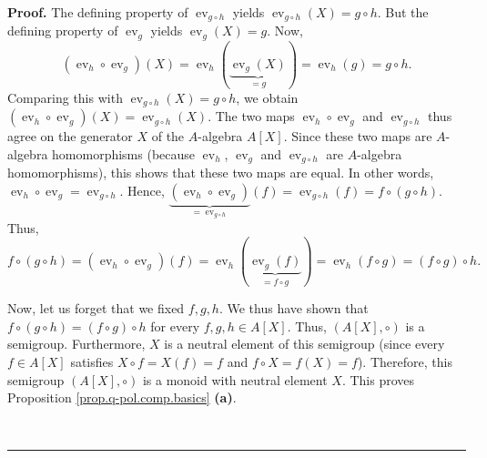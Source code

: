 \documentclass[numbers=enddot,12pt,final,onecolumn,notitlepage]{scrartcl}%
\theoremstyle{definition}
\newenvironment{proof}[1][Proof]{\noindent\textbf{#1.} }{\ \rule{0.5em}{0.5em}}
\begin{document}
\begin{proof}
The defining property of $\operatorname*{ev}\nolimits_{g\circ h}$ yields
$\operatorname*{ev}\nolimits_{g\circ h}\left(  X\right)  =g\circ h$. But the
defining property of $\operatorname*{ev}\nolimits_{g}$ yields
$\operatorname*{ev}\nolimits_{g}\left(  X\right)  =g$. Now,%
\[
\left(  \operatorname*{ev}\nolimits_{h}\circ\operatorname*{ev}\nolimits_{g}%
\right)  \left(  X\right)  =\operatorname*{ev}\nolimits_{h}\left(
\underbrace{\operatorname*{ev}\nolimits_{g}\left(  X\right)  }_{=g}\right)
=\operatorname*{ev}\nolimits_{h}\left(  g\right)  =g\circ h.
\]
Comparing this with $\operatorname*{ev}\nolimits_{g\circ h}\left(  X\right)
=g\circ h$, we obtain $\left(  \operatorname*{ev}\nolimits_{h}\circ
\operatorname*{ev}\nolimits_{g}\right)  \left(  X\right)  =\operatorname*{ev}%
\nolimits_{g\circ h}\left(  X\right)  $. The two maps $\operatorname*{ev}%
\nolimits_{h}\circ\operatorname*{ev}\nolimits_{g}$ and $\operatorname*{ev}%
\nolimits_{g\circ h}$ thus agree on the generator $X$ of the $A$-algebra
$A\left[  X\right]  $. Since these two maps are $A$-algebra homomorphisms
(because $\operatorname*{ev}\nolimits_{h}$, $\operatorname*{ev}\nolimits_{g}$
and $\operatorname*{ev}\nolimits_{g\circ h}$ are $A$-algebra homomorphisms),
this shows that these two maps are equal. In other words, $\operatorname*{ev}%
\nolimits_{h}\circ\operatorname*{ev}\nolimits_{g}=\operatorname*{ev}%
\nolimits_{g\circ h}$. Hence, $\underbrace{\left(  \operatorname*{ev}%
\nolimits_{h}\circ\operatorname*{ev}\nolimits_{g}\right)  }%
_{=\operatorname*{ev}\nolimits_{g\circ h}}\left(  f\right)
=\operatorname*{ev}\nolimits_{g\circ h}\left(  f\right)  =f\circ\left(  g\circ
h\right)  $. Thus,%
\[
f\circ\left(  g\circ h\right)  =\left(  \operatorname*{ev}\nolimits_{h}%
\circ\operatorname*{ev}\nolimits_{g}\right)  \left(  f\right)
=\operatorname*{ev}\nolimits_{h}\left(  \underbrace{\operatorname*{ev}%
\nolimits_{g}\left(  f\right)  }_{=f\circ g}\right)  =\operatorname*{ev}%
\nolimits_{h}\left(  f\circ g\right)  =\left(  f\circ g\right)  \circ h.
\]


Now, let us forget that we fixed $f,g,h$. We thus have shown that
$f\circ\left(  g\circ h\right)  =\left(  f\circ g\right)  \circ h$ for every
$f,g,h\in A\left[  X\right]  $. Thus, $\left(  A\left[  X\right]
,\circ\right)  $ is a semigroup. Furthermore, $X$ is a neutral element of this
semigroup (since every $f\in A\left[  X\right]  $ satisfies $X\circ f=X\left(
f\right)  =f$ and $f\circ X=f\left(  X\right)  =f$). Therefore, this semigroup
$\left(  A\left[  X\right]  ,\circ\right)  $ is a monoid with neutral element
$X$. This proves Proposition \ref{prop.q-pol.comp.basics} \textbf{(a)}.
\medskip


\end{proof}
\end{document}
